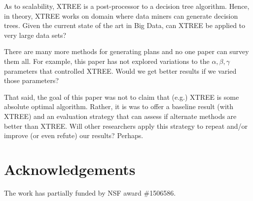 \documentclass{sig-alternate}
\begin{document}
As to scalability, XTREE is a post-processor to a decision tree algorithm. Hence, in theory,  XTREE   works on
  domain where data miners can generate decision trees. Given the current state of the art in Big Data,
can   XTREE  be applied to  very large data sets?

There are many more methods for generating plans and
no   one paper can survey them all. For example, this paper has not explored variations to the $\alpha,\beta,\gamma$
parameters that controlled XTREE. Would we get better results if we varied those parameters?

That said, the goal of this paper was not to claim that (e.g.) XTREE is some absolute optimal algorithm. Rather, it is
was to offer a baseline result (with XTREE) and an  evaluation strategy that  can assess  if alternate methods are better than XTREE.
Will other  researchers apply this strategy  to repeat and/or improve
(or even refute) our results?  Perhaps.

\section*{Acknowledgements}
The work has partially funded by NSF  award \#1506586.



\balance

\end{document}

